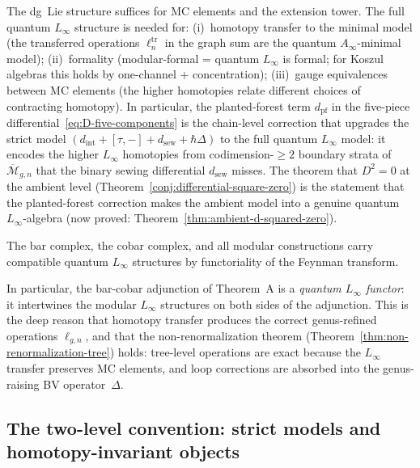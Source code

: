 \begin{remark}
\label{rem:full-homotopy-why}
The dg~Lie structure suffices for MC elements and the extension tower.
The full quantum $L_\infty$ structure is needed for:
\textup{(i)}~homotopy transfer to the minimal model (the transferred
operations $\ell_n^{\mathrm{tr}}$ in the graph sum are the quantum
$A_\infty$-minimal model);
\textup{(ii)}~formality (modular-formal = quantum $L_\infty$ is formal;
for Koszul algebras this holds by one-channel + concentration);
\textup{(iii)}~gauge equivalences between MC elements (the higher
homotopies relate different choices of contracting homotopy).
In particular, the planted-forest term $d_{\mathrm{pf}}$ in the
five-piece differential~\eqref{eq:D-five-components} is the
chain-level correction that upgrades the strict model
$(d_{\mathrm{int}} + [\tau,-] + d_{\mathrm{sew}} + \hbar\Delta)$
to the full quantum $L_\infty$ model: it encodes the higher
$L_\infty$ homotopies from codimension-${\geq}2$ boundary strata of
$\overline{\mathcal{M}}_{g,n}$ that the binary sewing differential
$d_{\mathrm{sew}}$ misses.  The theorem that $D^2 = 0$ at the
ambient level (Theorem~\ref{conj:differential-square-zero}) is
the statement that the planted-forest correction makes the ambient
model into a genuine quantum $L_\infty$-algebra
(now proved: Theorem~\ref{thm:ambient-d-squared-zero}).

The bar complex, the cobar complex, and all modular constructions
carry compatible quantum $L_\infty$ structures by functoriality of
the Feynman transform.

In particular, the bar-cobar adjunction of Theorem~A is a
\emph{quantum $L_\infty$ functor}: it intertwines the modular $L_\infty$
structures on both sides of the adjunction.  This is the deep reason
that homotopy transfer produces the correct genus-refined operations
$\ell_{g,n}$, and that the non-renormalization theorem
(Theorem~\ref{thm:non-renormalization-tree}) holds: tree-level
operations are exact because the $L_\infty$ transfer preserves MC
elements, and loop corrections are absorbed into the genus-raising
BV operator~$\Delta$.
\end{remark}


\subsection{The two-level convention: strict models and homotopy-invariant objects}
\label{subsec:two-level-convention}

